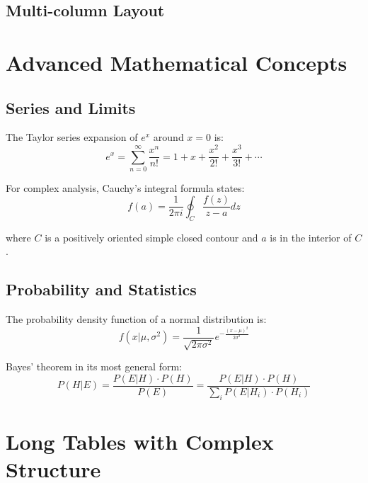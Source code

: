 \documentclass[12pt,a4paper,twoside]{article}
\theoremstyle{definition}
\begin{document}
\subsection{Multi-column Layout}

\begin{multicols}{2}
\lipsum[1-2]
\end{multicols}

\section{Advanced Mathematical Concepts}

\subsection{Series and Limits}

The Taylor series expansion of $e^x$ around $x = 0$ is:
\begin{equation}
e^x = \sum_{n=0}^{\infty} \frac{x^n}{n!} = 1 + x + \frac{x^2}{2!} + \frac{x^3}{3!} + \cdots
\end{equation}

For complex analysis, Cauchy's integral formula states:
\begin{equation}
f(a) = \frac{1}{2\pi i} \oint_C \frac{f(z)}{z-a} dz
\end{equation}

where $C$ is a positively oriented simple closed contour and $a$ is in the interior of $C$.

\subsection{Probability and Statistics}

The probability density function of a normal distribution is:
\begin{equation}
f(x|\mu,\sigma^2) = \frac{1}{\sqrt{2\pi\sigma^2}} e^{-\frac{(x-\mu)^2}{2\sigma^2}}
\end{equation}

Bayes' theorem in its most general form:
\begin{equation}
P(H|E) = \frac{P(E|H) \cdot P(H)}{P(E)} = \frac{P(E|H) \cdot P(H)}{\sum_{i} P(E|H_i) \cdot P(H_i)}
\end{equation}

\section{Long Tables with Complex Structure}
\end{document}
